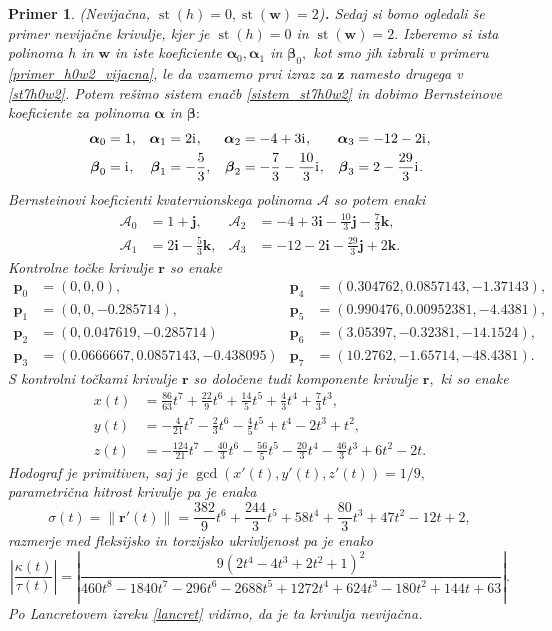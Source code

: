 \documentclass[12pt,a4paper,twoside]{article}
\newcommand{\iu}{\mathrm{i}\mkern1mu} %
\theoremstyle{definition} %
\theoremstyle{plain} %
\theoremstyle{primerstyle}
\newtheorem{primer}[definicija]{Primer}
\numberwithin{equation}{section}  %
\newcommand{\pV}{\mathbf{p}}
\newcommand{\rV}{\mathbf{r}}
\newcommand{\iV}{\mathbf{i}}
\newcommand{\jV}{\mathbf{j}}
\newcommand{\kV}{\mathbf{k}}
\newcommand{\wV}{\mathbf{w}}
\newcommand{\zV}{\mathbf{z}}
\newcommand{\AQ}{\mathcal{A}}
\newcommand{\balpha}{\boldsymbol \alpha}
\newcommand{\bbeta}{\boldsymbol \beta}
\DeclareMathOperator{\st}{st}
\begin{document}
\begin{primer}
	\label{primer_h0w2_nevijacna}
	\textnormal{ }(Nevijačna, $\st(h)=0,\st(\wV)=2$)\textbf{.}
	Sedaj si bomo ogledali še primer nevijačne krivulje, kjer je $\st(h)=0$ in $\st(\wV)=2.$ Izberemo si ista polinoma $h$ in $\wV$ in iste koeficiente $\balpha_0,\balpha_1$ in $\bbeta_0,$ kot smo jih izbrali v primeru \ref{primer_h0w2_vijacna}, le da vzamemo prvi izraz za $\zV$ namesto drugega v \eqref{st7h0w2}. Potem rešimo sistem enačb \eqref{sistem_st7h0w2} in dobimo Bernsteinove koeficiente za polinoma $\balpha$ in $\bbeta:$
	\begin{align*}
		\balpha_0&=1,&\balpha_1&=2\iu,&\balpha_2&=-4+3\iu,&\balpha_3&=-12-2\iu,\\
		\bbeta_0&=\iu,&\bbeta_1&=-\frac{5}{3},&\bbeta_2&=-\frac{7}{3}-\frac{10}{3}\iu,&\bbeta_3&=2-\frac{29}{3}\iu.
	\end{align*}
	Bernsteinovi koeficienti kvaternionskega polinoma $\AQ$ so potem enaki
	\begin{align*}
		\AQ_0&=1+\jV,&\AQ_2&=-4+3\iV-\frac{10}{3}\jV-\frac{7}{3}\kV,\\
		\AQ_1&=2\iV-\frac{5}{3}\kV,&\AQ_3&=-12-2\iV-\frac{29}{3}\jV+2\kV.
	\end{align*}
	Kontrolne točke krivulje $\rV$ so enake
	\begin{align*}
		\pV_0&=(0,0,0),&\pV_4&=(0.304762, 0.0857143, -1.37143),\\
		\pV_1&=(0, 0, -0.285714),&\pV_5&=(0.990476, 0.00952381, -4.4381),\\
		\pV_2&=(0, 0.047619, -0.285714)&\pV_6&=(3.05397, -0.32381, -14.1524),\\
		\pV_3&=(0.0666667, 0.0857143, -0.438095)&\pV_7&=(10.2762, -1.65714, -48.4381).
	\end{align*}
	S kontrolni točkami krivulje $\rV$ so določene tudi komponente krivulje $\rV,$ ki so enake
	\begin{align*}
		x(t)&=\frac{86}{63}t^7+\frac{22}{9}t^6+\frac{14}{5}t^5+\frac{4}{3}t^4+\frac{7}{3}t^3,\\
		y(t)&=-\frac{4}{21}t^7-\frac{2}{3}t^6-\frac{4}{5}t^5+t^4-2t^3+t^2,\\
		z(t)&=-\frac{124}{21}t^7-\frac{40}{3}t^6-\frac{56}{5}t^5-\frac{20}{3}t^4-\frac{46}{3}t^3+6t^2-2t.
	\end{align*}
	Hodograf je primitiven, saj je $\gcd(x'(t),y'(t),z'(t))=1/9,$ parametrična hitrost krivulje pa je enaka
	\begin{equation*}
		\sigma(t)=\lVert\rV'(t)\rVert=\frac{382}{9}t^6+\frac{244}{3}t^5+58t^4+\frac{80}{3}t^3+47t^2-12t+2,
	\end{equation*}
	razmerje med fleksijsko in torzijsko ukrivljenost pa je enako $$\left|\frac{\kappa(t)}{\tau(t)}\right|=\left|\frac{9(2t^4-4t^3+2t^2+1)^2}{460t^8-1840t^7-296t^6-2688t^5+1272t^4+624t^3-180t^2+144t+63}\right|.$$ Po Lancretovem izreku \ref{lancret} vidimo, da je ta krivulja nevijačna.
	

\end{primer}
\end{document}
